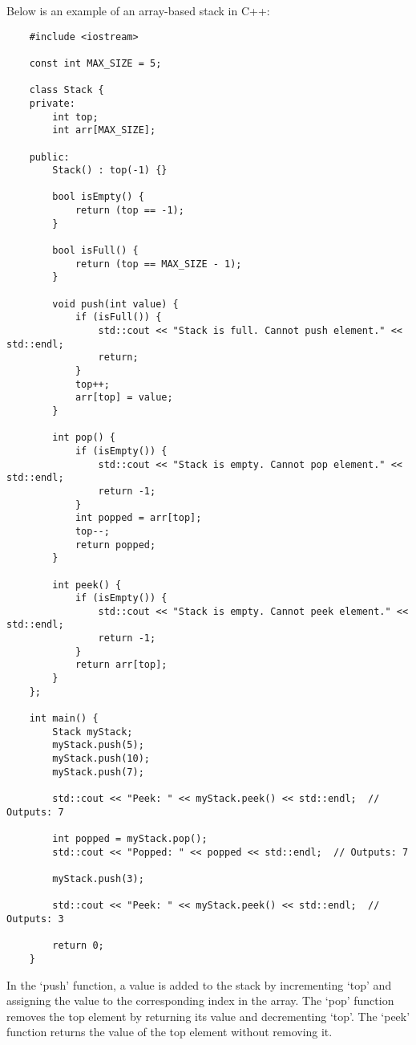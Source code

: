 \begin{solution}
    Below is an example of an array-based stack in C++:

    \horizontalline

    \begin{verbatim}
    #include <iostream>

    const int MAX_SIZE = 5;
    
    class Stack {
    private:
        int top;
        int arr[MAX_SIZE];
    
    public:
        Stack() : top(-1) {}
    
        bool isEmpty() {
            return (top == -1);
        }
    
        bool isFull() {
            return (top == MAX_SIZE - 1);
        }
    
        void push(int value) {
            if (isFull()) {
                std::cout << "Stack is full. Cannot push element." << std::endl;
                return;
            }
            top++;
            arr[top] = value;
        }
    
        int pop() {
            if (isEmpty()) {
                std::cout << "Stack is empty. Cannot pop element." << std::endl;
                return -1;
            }
            int popped = arr[top];
            top--;
            return popped;
        }
    
        int peek() {
            if (isEmpty()) {
                std::cout << "Stack is empty. Cannot peek element." << std::endl;
                return -1;
            }
            return arr[top];
        }
    };
    
    int main() {
        Stack myStack;
        myStack.push(5);
        myStack.push(10);
        myStack.push(7);
    
        std::cout << "Peek: " << myStack.peek() << std::endl;  // Outputs: 7
    
        int popped = myStack.pop();
        std::cout << "Popped: " << popped << std::endl;  // Outputs: 7
    
        myStack.push(3);
    
        std::cout << "Peek: " << myStack.peek() << std::endl;  // Outputs: 3
    
        return 0;
    }
    \end{verbatim}

    \horizontalline

    In the `push' function, a value is added to the stack by incrementing `top' and assigning the value to the corresponding index in the array. The `pop' function removes the top element by returning its value and decrementing `top'. The `peek' function returns the value of the top element without removing it.


\end{solution}
